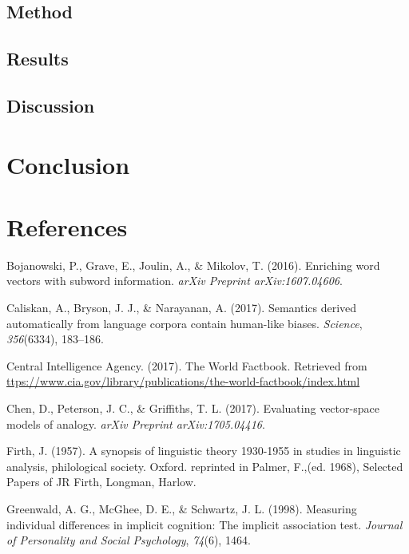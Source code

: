 \documentclass[10pt, letterpaper]{article}
\begin{document}
\subsection{Method}\label{method-3}

\subsection{Results}\label{results-3}

\subsection{Discussion}\label{discussion-2}

\section{Conclusion}\label{conclusion}

\section{References}\label{references}

\setlength{\parindent}{-0.1in} \setlength{\leftskip}{0.125in} \noindent

\hypertarget{refs}{}
\hypertarget{ref-bojanowski2016enriching}{}
Bojanowski, P., Grave, E., Joulin, A., \& Mikolov, T. (2016). Enriching
word vectors with subword information. \emph{arXiv Preprint
arXiv:1607.04606}.

\hypertarget{ref-caliskan2017semantics}{}
Caliskan, A., Bryson, J. J., \& Narayanan, A. (2017). Semantics derived
automatically from language corpora contain human-like biases.
\emph{Science}, \emph{356}(6334), 183--186.

\hypertarget{ref-ciafactbook}{}
Central Intelligence Agency. (2017). The World Factbook. Retrieved from
\url{ttps://www.cia.gov/library/publications/the-world-factbook/index.html}

\hypertarget{ref-chen2017evaluating}{}
Chen, D., Peterson, J. C., \& Griffiths, T. L. (2017). Evaluating
vector-space models of analogy. \emph{arXiv Preprint arXiv:1705.04416}.

\hypertarget{ref-firth1957synopsis}{}
Firth, J. (1957). A synopsis of linguistic theory 1930-1955 in studies
in linguistic analysis, philological society. Oxford. reprinted in
Palmer, F.,(ed. 1968), Selected Papers of JR Firth, Longman, Harlow.

\hypertarget{ref-greenwald1998measuring}{}
Greenwald, A. G., McGhee, D. E., \& Schwartz, J. L. (1998). Measuring
individual differences in implicit cognition: The implicit association
test. \emph{Journal of Personality and Social Psychology}, \emph{74}(6),
1464.
\end{document}
